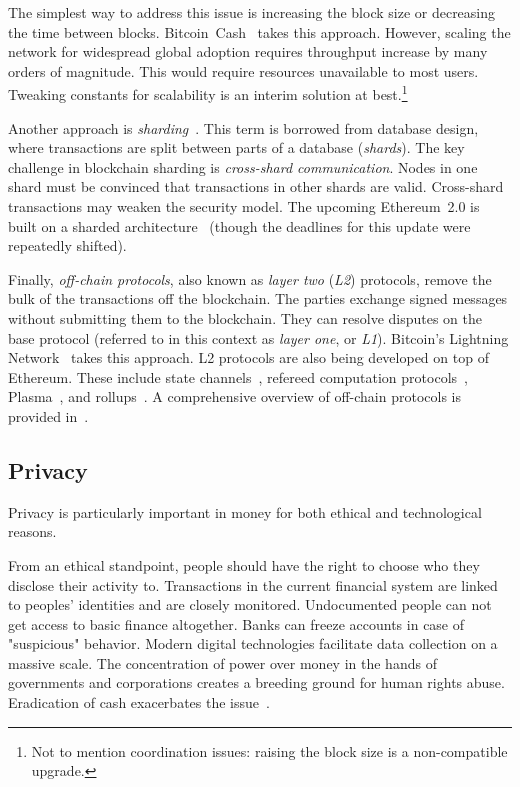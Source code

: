 The simplest way to address this issue is increasing the block size or decreasing the time between blocks.
Bitcoin~Cash~\cite{Kwon2019} takes this approach.
However, scaling the network for widespread global adoption requires throughput increase by many orders of magnitude.
This would require resources unavailable to most users.
Tweaking constants for scalability is an interim solution at best.\footnote{Not to mention coordination issues: raising the block size is a non-compatible upgrade.}

Another approach is \textit{sharding}~\cite{Gencer2016, Luu2016a}.
This term is borrowed from database design, where transactions are split between parts of a database (\textit{shards}).
The key challenge in blockchain sharding is \textit{cross-shard communication}.
Nodes in one shard must be convinced that transactions in other shards are valid.
Cross-shard transactions may weaken the security model.
The upcoming Ethereum~2.0 is built on a sharded architecture~\cite{ShardingFAQ} (though the deadlines for this update were repeatedly shifted).

Finally, \textit{off-chain protocols}, also known as \textit{layer two} (\textit{L2}) protocols, remove the bulk of the transactions off the blockchain.
The parties exchange signed messages without submitting them to the blockchain.
They can resolve disputes on the base protocol (referred to in this context as \textit{layer one}, or \textit{L1}).
Bitcoin's Lightning Network~\cite{Poon2016} takes this approach.
L2 protocols are also being developed on top of Ethereum.
These include state channels~\cite{Dziembowski2017, RaidenWebsite, Miller2019, }, refereed computation protocols~\cite{Teutsch2017, Kalodner2018}, Plasma~\cite{Poon2017}, and rollups~\cite{Floersch2019, Gluchowski2019}.
A comprehensive overview of off-chain protocols is provided in~\cite{Gudgeon2019}.


\subsection{Privacy}

Privacy is particularly important in money for both ethical and technological reasons.

From an ethical standpoint, people should have the right to choose who they disclose their activity to.
Transactions in the current financial system are linked to peoples' identities and are closely monitored.
Undocumented people can not get access to basic finance altogether.
Banks can freeze accounts in case of "suspicious" behavior.
Modern digital technologies facilitate data collection on a massive scale.
The concentration of power over money in the hands of governments and corporations creates a breeding ground for human rights abuse.
Eradication of cash exacerbates the issue~\cite{Brito2019}.

